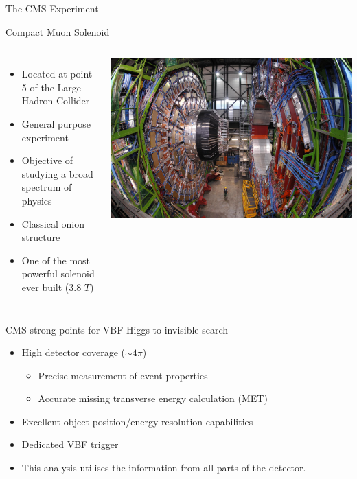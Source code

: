 \documentclass[8pt]{beamer}
\begin{document}
\begin{frame}{The CMS Experiment}
 
\begin{block}{Compact Muon Solenoid}

    \begin{columns}
      \column[t]{6.5cm}

      \begin{itemize}
        \item Located at point 5 of the Large Hadron Collider 
        \item General purpose experiment
        \item Objective of studying a broad spectrum of physics
        \item Classical onion structure
        \item One of the most powerful solenoid ever built (3.8 $T$)
      \end{itemize}  

      \column[t]{4.5cm}
      \begin{center}
        \includegraphics[width=1.00\textwidth]{img/CMSOpen.jpg} 
      \end{center}

    \end{columns}

\end{block}
\begin{block}{CMS strong points for VBF Higgs to invisible search}  

\begin{itemize}
  \item High detector coverage ($\sim4 \pi$)
  \begin{itemize}
    \item Precise measurement of event properties
    \item Accurate missing transverse energy calculation (MET)  
  \end{itemize}
  \item Excellent object position/energy resolution capabilities
  \item Dedicated VBF trigger
  \item This analysis utilises the information from all parts of the detector.
\end{itemize}


\end{block}
\end{frame}
\end{document}
